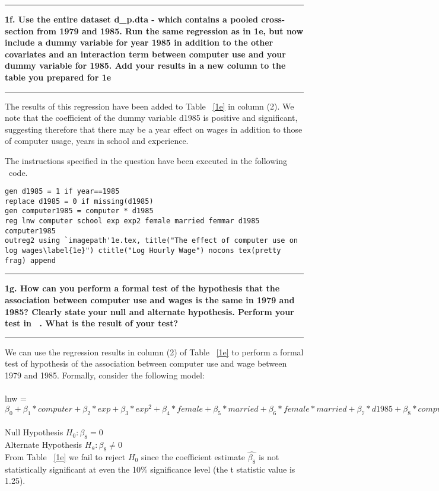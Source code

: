 \documentclass[12pt]{article}
\newcommand\question[1]{\vspace{1em}\hrule\vspace{1em}\textbf{#1}\vspace{1em}\hrule\vspace{1em}}
\begin{document}
\begin{table}
\caption{}

\end{table}

\question{1f. Use the entire dataset d\_p.dta - which contains a pooled cross-section from 1979 and 1985. Run the same regression as in 1e, but now include a dummy variable for year 1985 in addition to the other covariates and an interaction term between computer use and your dummy variable for 1985. Add your results in a new column to the table you prepared for 1e}
The results of this regression have been added to Table ~\ref{1e} in column (2). We note that the coefficient of the dummy variable d1985 is positive and significant, suggesting therefore that there may be a year effect on wages in addition to those of computer usage, years in school and experience.

The instructions specified in the question have been executed in the following \stata \  code.\\
\begin{lstlisting}
gen d1985 = 1 if year==1985
replace d1985 = 0 if missing(d1985)
gen computer1985 = computer * d1985
reg lnw computer school exp exp2 female married femmar d1985 computer1985
outreg2 using `imagepath'1e.tex, title("The effect of computer use on log wages\label{1e}") ctitle("Log Hourly Wage") nocons tex(pretty frag) append
\end{lstlisting}

\newpage
\question{1g. How can you perform a formal test of the hypothesis that the association between computer use and wages is the same in 1979 and 1985? Clearly state your null and alternate hypothesis. Perform your test in \stata \ . What is the result of your test?}
We can use the regression results in column (2) of Table ~\ref{1e} to perform a formal test of hypothesis of the association between computer use and wage between 1979 and 1985. Formally, consider the following model:\\\\
lnw = $\beta_0 + \beta_1 * computer + \beta_2 * exp + \beta_3 * exp^2 + \beta_4 * female + \beta_5 * married + \beta_6 * female * married + \beta_7 * d1985 + \beta_8 * computer * d1985 $ \\\\
Null Hypothesis $H_0: \beta_8  = 0$ \\ Alternate Hypothesis $H_a: \beta_8  \neq 0$\\

From  Table ~\ref{1e} we fail to reject $H_0$ since the coefficient estimate $\hat{\beta_8}$ is not statistically significant at even the 10\%  significance level (the t statistic value is 1.25).
\end{document}
